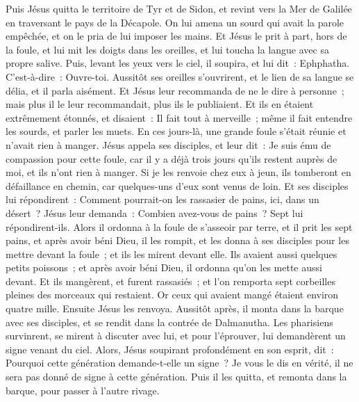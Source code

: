 \begin{multicols}{2}
Puis Jésus quitta le territoire de Tyr et de Sidon, et revint vers la Mer de Galilée en traversant le pays de la Décapole.
On lui amena un sourd qui avait la parole empêchée, et on le pria de lui imposer les mains.
Et Jésus le prit à part, hors de la foule, et lui mit les doigts dans les oreilles, et lui toucha la langue avec sa propre salive.
Puis, levant les yeux vers le ciel, il soupira, et lui dit~: Ephphatha. C'est-à-dire~: Ouvre-toi.
Aussitôt ses oreilles s'ouvrirent, et le lien de sa langue se délia, et il parla aisément.
Et Jésus leur recommanda de ne le dire à personne~; mais plus il le leur recommandait, plus ils le publiaient.
Et ils en étaient extrêmement étonnés, et disaient~: Il fait tout à merveille~; même il fait entendre les sourds, et parler les muets.
\VerseOne{}En ces jours-là, une grande foule s'était réunie et n'avait rien à manger. Jésus appela ses disciples, et leur dit~:
Je suis ému de compassion pour cette foule, car il y a déjà trois jours qu'ils restent auprès de moi, et ils n'ont rien à manger.
Si je les renvoie chez eux à jeun, ils tomberont en défaillance en chemin, car quelques-uns d'eux sont venus de loin.
Et ses disciples lui répondirent~: Comment pourrait-on les rassasier de pains, ici, dans un désert~?
Jésus leur demanda~: Combien avez-vous de pains~? Sept lui répondirent-ils.
Alors il ordonna à la foule de s'asseoir par terre, et il prit les sept pains, et après avoir béni Dieu, il les rompit, et les donna à ses disciples pour les mettre devant la foule~; et ils les mirent devant elle.
Ils avaient aussi quelques petits poissons~; et après avoir béni Dieu, il ordonna qu'on les mette aussi devant.
Et ils mangèrent, et furent rassasiés~; et l'on remporta sept corbeilles pleines des morceaux qui restaient.
Or ceux qui avaient mangé étaient environ quatre mille. Ensuite Jésus les renvoya.
Aussitôt après, il monta dans la barque avec ses disciples, et se rendit dans la contrée de Dalmanutha.
Les pharisiens survinrent, se mirent à discuter avec lui, et pour l'éprouver, lui demandèrent un signe venant du ciel.
Alors, Jésus soupirant profondément en son esprit, dit~: Pourquoi cette génération demande-t-elle un signe~? Je vous le dis en vérité, il ne sera pas donné de signe à cette génération.
Puis il les quitta, et remonta dans la barque, pour passer à l'autre rivage.

\end{multicols}
